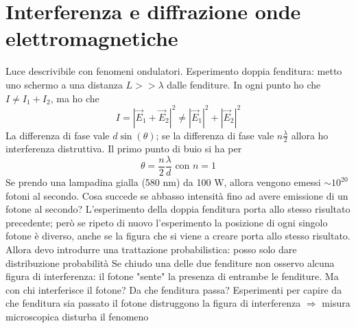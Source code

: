 \documentclass[a4paper,11pt]{report}
\theoremstyle{remark}
\theoremstyle{definition}
\begin{document}
\chapter{Interferenza e diffrazione onde elettromagnetiche}
Luce descrivibile con fenomeni ondulatori. \newline
Esperimento doppia fenditura: metto uno schermo a una distanza $L >> \lambda$ dalle fenditure. In ogni punto ho che $ I \neq I_1 + I_2$, ma ho che 
\begin{equation*}
    I = {|\vec{E}_1 + \vec{E}_2|}^2 \neq {|\vec{E}_1|}^2 + {|\vec{E}_2|}^2
\end{equation*}
La differenza di fase vale $d\sin(\theta)$; se la differenza di fase vale $n\frac{\lambda}{2}$ allora ho interferenza distruttiva. Il primo punto di buio si ha per 
\begin{equation*}
    \theta = \frac{n}{2}\frac{\lambda}{d} \text{ con } n=1
\end{equation*}
Se prendo una lampadina gialla (580 nm) da 100 W, allora vengono emessi $\sim 10^{20}$ fotoni al secondo. Cosa succede se abbasso intensità fino ad avere emissione di un fotone al secondo? L'esperimento della doppia fenditura porta allo stesso risultato precedente; però se ripeto di nuovo l'esperimento la posizione di ogni singolo fotone è diverso, anche se la figura che si viene a creare porta allo stesso risultato. Allora devo introdurre una trattazione probabilistica: posso solo dare distribuzione probabilità \newline
Se chiudo una delle due fenditure non osservo alcuna figura di interferenza: il fotone "sente" la presenza di entrambe le fenditure. Ma con chi interferisce il fotone? Da che fenditura passa? \newline
Esperimenti per capire da che fenditura sia passato il fotone distruggono la figura di interferenza $\Rightarrow$ misura microscopica disturba il fenomeno
\end{document}

